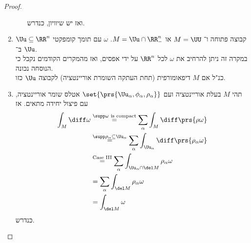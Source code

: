 \documentclass[a4paper,10pt,twoside,openany]{book}
\begin{document}
\begin{proof}
\begin{enumerate}[label = מקרה \Roman* :]
\begin{enumerate}[label = (\arabic*)]
ואז יש שיוויון, כנדרש.
\end{enumerate}
\item
$\Uu \subseteq \RR^n$
קבוצה פתוחה ו־%
$M = \UU$
או
$M = \Uu \cap \RR^n_-$.
$\omega$
עם תומך קומפקטי ב־%
$\Uu$.\\
במקרה זה ניתן להרחיב את
$\omega$
לכל
$\RR^n$
על ידי אפסים, ואז מהמקרים הקודמים נקבל כי הנוסחה נכונה.\\
כנ"ל אם
$M$
דיפאומורפית (תחת העתקה השומרת אוריינטציה) לקבוצה
$\Uu$
כזו.
\item
תהי
$M$
בעלת אוריינטציה ועם
$\set{\prs{\Uu_{\alpha}, \phi_{\alpha}, \rho_{\alpha}}}$
אטלס שומר אוריינטציה, עם פיצול יחידה מתאים. אז
\begin{align*}
\int_M \diff \omega &\stackrel{\text{$\supp \omega$ is compact}}{=} \sum_{\alpha} \int_M \diff \prs{\rho \omega} \\&\stackrel{\supp \rho_{\alpha} \subseteq \Uu_{\alpha}}{=} \sum_{\alpha} \int_{\Uu_{\alpha}} \diff\prs{\rho_{\alpha} \omega} \\&\stackrel{\text{Case III}}{=} \sum_{\alpha} \int_{\Uu_{\alpha} \cap \del M} \rho_{\alpha} \omega \\&= \sum_{\alpha} \int_{\del M} \rho_{\alpha} \omega \\&= \int_{\del M}{\omega}
\end{align*}
כנדרש.
\end{enumerate}
\end{proof}
\end{document}
